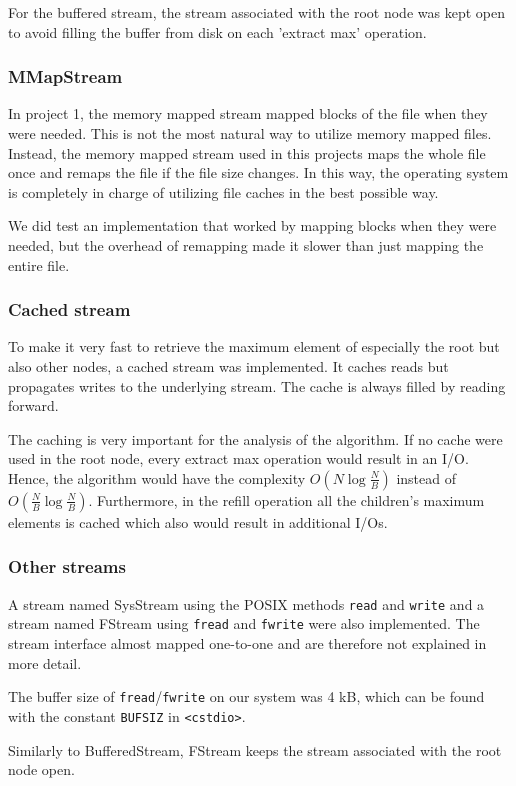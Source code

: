 
For the buffered stream, the stream associated with the root node was kept open to avoid filling the buffer from disk on each 'extract max' operation.

\subsubsection{MMapStream}

In project 1, the memory mapped stream mapped blocks of the file when they were needed. This is not the most natural way to utilize memory mapped files. Instead, the memory mapped stream used in this projects maps the whole file once and remaps the file if the file size changes. In this way, the operating system is completely in charge of utilizing file caches in the best possible way.

We did test an implementation that worked by mapping blocks when they were needed, but the overhead of remapping made it slower than just mapping the entire file.

\subsubsection{Cached stream}

To make it very fast to retrieve the maximum element of especially the root but also other nodes, a cached stream was implemented. It caches reads but propagates writes to the underlying stream. The cache is always filled by reading forward.

The caching is very important for the analysis of the algorithm. If no cache were used in the root node, every extract max operation would result in an I/O. Hence, the algorithm would have the complexity $O(N\log \frac{N}{B})$ instead of $O(\frac{N}{B}\log \frac{N}{B})$. Furthermore, in the refill operation all the children's maximum elements is cached which also would result in additional I/Os.

\subsubsection{Other streams}

A stream named SysStream using the POSIX methods \texttt{read} and \texttt{write} and a stream named FStream using \texttt{fread} and \texttt{fwrite} were also implemented. The stream interface almost mapped one-to-one and are therefore not explained in more detail.

The buffer size of \texttt{fread}/\texttt{fwrite} on our system was 4 kB, which can be found with the constant \texttt{BUFSIZ} in \texttt{<cstdio>}.

Similarly to BufferedStream, FStream keeps the stream associated with the root node open.

